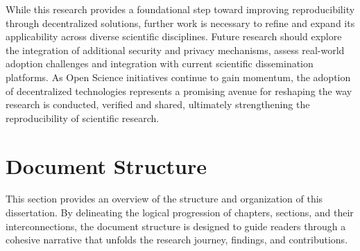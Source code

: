 \documentclass{article}
\begin{document}
While this research provides a foundational step toward improving reproducibility through decentralized solutions, further work is necessary to refine and expand its applicability across diverse scientific disciplines. Future research should explore the integration of additional security and privacy mechanisms, assess real-world adoption challenges and integration with current scientific dissemination platforms. As Open Science initiatives continue to gain momentum, the adoption of decentralized technologies represents a promising avenue for reshaping the way research is conducted, verified and shared, ultimately strengthening the reproducibility of scientific research.

\section{Document Structure}

This section provides an overview of the structure and organization of this dissertation. By delineating the logical progression of chapters, sections, and their interconnections, the document structure is designed to guide readers through a cohesive narrative that unfolds the research journey, findings, and contributions.
\end{document}
